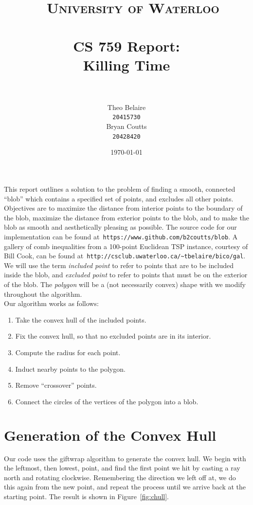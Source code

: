 \documentclass[paper=a4, fontsize=11pt]{scrartcl} %
\title{\
    \normalfont\normalsize
    \textsc{University of Waterloo} \\ [25pt] %
    \horrule{0.5pt} \\[0.4cm] %
    \huge CS 759 Report:\\
    Killing Time \\
    \horrule{2pt} \\[0.5cm] %
}
\author{Theo Belaire \\ \texttt{20415730} \\ Bryan Coutts \\ \texttt{20428420}} %
\date{\normalsize\today} %
\numberwithin{equation}{section} %
\numberwithin{figure}{section} %
\numberwithin{table}{section} %
\begin{document}
\maketitle %

This report outlines a solution to the problem of finding a smooth, connected
``blob'' which contains a specified set of points, and excludes all other
points. Objectives are to maximize the distance from interior points to the
boundary of the blob, maximize the distance from exterior points to the blob,
and to make the blob as smooth and aesthetically pleasing as possible. The
source code for our implementation can be found at\,
\verb|https://www.github.com/b2coutts/blob|. A gallery of comb inequalities from
a 100-point Euclidean TSP instance, courtesy of Bill Cook, can be found at\,
\verb|http://csclub.uwaterloo.ca/~tbelaire/bico/gal|. \\

We will use the term \textit{included point} to refer to points that are to be
included inside the blob, and \textit{excluded point} to refer to points that
must be on the exterior of the blob. The \textit{polygon} will be a (not
necessarily convex) shape with we modify throughout the algorithm. \\

Our algorithm works as follows:
\begin{enumerate}
\item Take the convex hull of the included points.
\item Fix the convex hull, so that no excluded points are in its interior.
\item Compute the radius for each point.
\item Induct nearby points to the polygon. 
\item Remove ``crossover'' points.
\item Connect the circles of the vertices of the polygon into a blob.
\end{enumerate}


\section{Generation of the Convex Hull}
Our code uses the giftwrap algorithm to generate the convex hull. We begin with
the leftmost, then lowest, point, and find the first point we hit by casting a
ray north and rotating clockwise. Remembering the direction we left off at, we
do this again from the new point, and repeat the process until we arrive back at
the starting point. The result is shown in Figure~\ref{fig:chull}. \\
\end{document}
